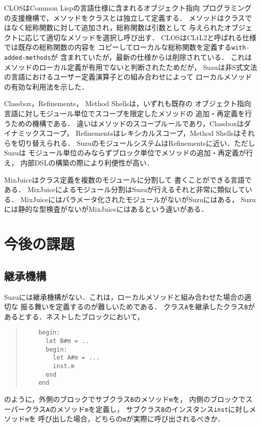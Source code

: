 \documentclass[a4paper,11pt,dvipdfmx]{jreport}
\begin{document}
CLOS\cite{CLOS}はCommon Lispの言語仕様に含まれるオブジェクト指向
プログラミングの支援機構で，メソッドをクラスとは独立して定義する．
メソッドはクラスではなく総称関数に対して追加され，総称関数は引数として
与えられたオブジェクトに応じて適切なメソッドを選択し呼び出す．
CLOSはCLtL2\cite{CLtL2}と呼ばれる仕様では既存の総称関数の内容を
コピーしてローカルな総称関数を定義する\verb|with-added-methods|が
含まれていたが，最新の仕様からは削除されている．
これはメソッドのローカル定義が有用でないと判断されたためだが，
Suzuは非S式文法の言語におけるユーザー定義演算子との組み合わせによって
ローカルメソッドの有効な利用法を示した．

Classbox\cite{Classboxes}，Refinements\cite{Refinements}，
Method Shells\cite{MethodShells}は，いずれも既存の
オブジェクト指向言語に対しモジュール単位でスコープを限定したメソッドの
追加・再定義を行うための機構である．
違いはメソッドのスコープルールであり，Classboxはダイナミックスコープ，
Refinementsはレキシカルスコープ，Method Shellsはそれらを切り替えられる．
SuzuのモジュールシステムはRefinementsに近い．ただしSuzuは
モジュール単位のみならずブロック単位でメソッドの追加・再定義が行え，
内部DSLの構築の際により利便性が高い．

MixJuice\cite{MixJuice}はクラス定義を複数のモジュールに分割して
書くことができる言語である．
MixJuiceによるモジュール分割はSuzuが行えるそれと非常に類似している．
MixJuiceにはパラメータ化されたモジュールがないがSuzuにはある，
Suzuには静的な型検査がないがMixJuiceにはあるという違いがある．


\chapter{今後の課題}
\label{chapter:future-work}

\section{継承機構}

Suzuには継承機構がない．これは，ローカルメソッドと組み合わせた場合の適切な
振る舞いを定義するのが難しいためである．
クラス\verb|A|を継承したクラス\verb|B|があるとする．ネストしたブロックにおいて，
\begin{quote}
	\begin{verbatim}
	begin:
	  let B#m = ..
	  begin:
	    let A#m = ...
	    inst.m
	  end
	end
	\end{verbatim}
\end{quote}
のように，外側のブロックでサブクラス\verb|B|のメソッド\verb|m|を，
内側のブロックでスーパークラス\verb|A|のメソッド\verb|m|を定義し，
サブクラス\verb|B|のインスタンス\verb|inst|に対しメソッド\verb|m|を
呼び出した場合，どちらの\verb|m|が実際に呼び出されるべきか．
\end{document}
